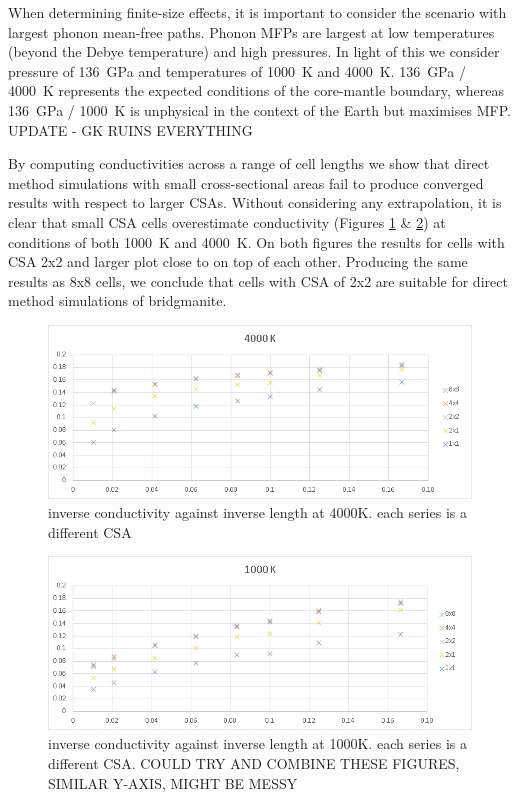 \documentclass[%
preprint,                                  %
nofootinbib,
 amsmath,amssymb,
 aps,
]{revtex4-1}
\begin{document}
When determining finite-size effects, it is important to consider the scenario with largest phonon mean-free paths. Phonon MFPs are largest at low temperatures (beyond the Debye temperature) and high pressures. In light of this we consider pressure of 136~GPa and temperatures of 1000~K and 4000~K. 136~GPa / 4000~K represents the expected conditions of the core-mantle boundary, whereas 136~GPa / 1000~K is unphysical in the context of the Earth but maximises MFP.  UPDATE - GK RUINS EVERYTHING

By computing conductivities across a range of cell lengths we show that direct method simulations with small cross-sectional areas fail to produce converged results with respect to larger CSAs. Without considering any extrapolation, it is clear that small CSA cells overestimate conductivity (Figures \ref{fig:direct_length_graph_4000} \& \ref{fig:direct_length_graph_1000}) at conditions of both 1000~K and 4000~K. On both figures the results for cells with CSA 2x2 and larger plot close to on top of each other. Producing the same results as 8x8 cells, we conclude that cells with CSA of 2x2 are suitable for direct method simulations of bridgmanite.

\begin{figure}[h]
  \includegraphics[width=\linewidth]{images/direct_length_graph_4000.png}
  \caption{inverse conductivity against inverse length at 4000K. each series is a different CSA}
  \label{fig:direct_length_graph_4000}
\end{figure}

\begin{figure}[h]
  \includegraphics[width=\linewidth]{images/direct_length_graph_1000.png}
  \caption{inverse conductivity against inverse length at 1000K. each series is a different CSA. COULD TRY AND COMBINE THESE FIGURES, SIMILAR Y-AXIS, MIGHT BE MESSY}
  \label{fig:direct_length_graph_1000}
\end{figure}
\end{document}
